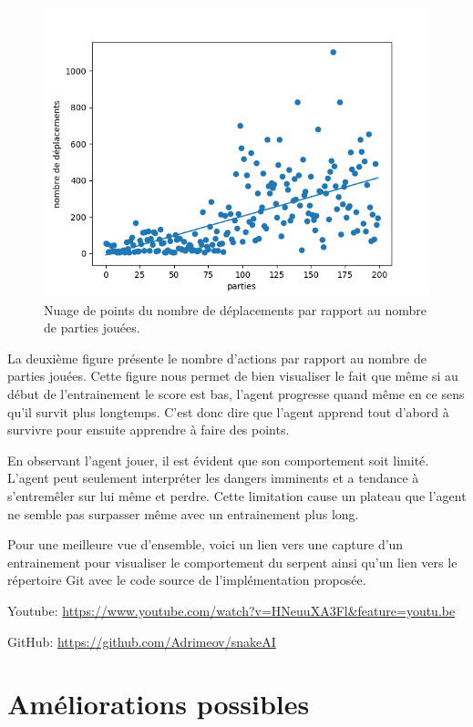 \documentclass{article}
\begin{document}
\begin{figure}[ht]
	\includegraphics[width=\linewidth]{moves_per_game_200.png}
	\caption{Nuage de points du nombre de déplacements par rapport au nombre de parties jouées.}
	\label{fig:Snake}
\end{figure}

La deuxième figure présente le nombre d'actions par rapport au nombre de parties jouées. Cette figure nous permet de bien visualiser le fait que même si au début de l'entrainement le score est bas, l'agent progresse quand même en ce sens qu'il survit plus longtemps. C'est donc dire que l'agent apprend tout d'abord à survivre pour ensuite apprendre à faire des points.  

En observant l'agent jouer, il est évident que son comportement soit limité. L'agent peut seulement interpréter les dangers imminents et a tendance à s'entremêler sur lui même et perdre. Cette limitation cause un plateau que l'agent ne semble pas surpasser même avec un entrainement plus long.


Pour une meilleure vue d'ensemble, voici un lien vers une capture d’un entrainement pour visualiser le comportement du serpent ainsi qu'un lien vers le répertoire Git avec le code source de l'implémentation proposée.

Youtube:
\scriptsize\href{https://www.youtube.com/watch?v=HNeuuXA3Flg&feature=youtu.be}{https://www.youtube.com/watch?v=HNeuuXA3Fl\&feature=youtu.be}

\normalsize GitHub: 
\href{https://github.com/Adrimeov/snakeAI}{https://github.com/Adrimeov/snakeAI}


\section{Améliorations possibles}
\end{document}
